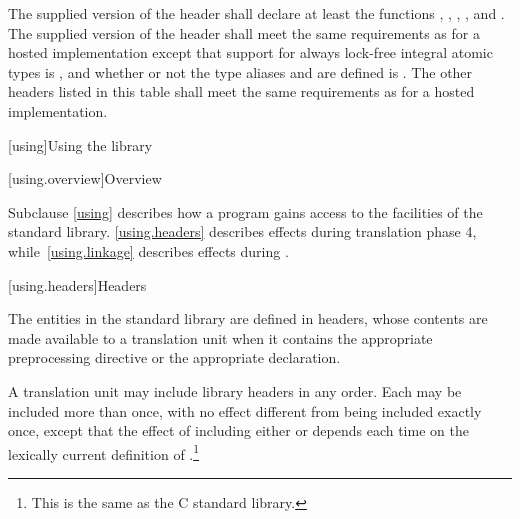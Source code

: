 \pnum
The supplied version of the header 
shall declare at least the functions
%
,
%
,
%
,
%
,
and
%
.
The supplied version of the header 
shall meet the same requirements as for a hosted implementation
except that support for
always lock-free integral atomic types
is , and
whether or not the type aliases  and
 are defined
is .
The other headers listed in this table
shall meet the same requirements as for a hosted implementation.

[using]{Using the library}

[using.overview]{Overview}

\pnum
Subclause \ref{using} describes how a \Cpp{} program gains access to the facilities of the
\Cpp{} standard library. \ref{using.headers} describes effects during translation
phase 4, while~\ref{using.linkage} describes effects during .

[using.headers]{Headers}

\pnum
The entities in the \Cpp{} standard library are defined in headers,
whose contents are made available to a translation unit when it contains the appropriate
%
%
preprocessing directive
or the appropriate
%
 declaration.

\pnum
A translation unit may include library headers in any order.
%
Each may be included more than once, with no effect different from
being included exactly once, except that the effect of including either
 or 
depends each time on the lexically current definition of
%
%
.\footnote{This is the same as the C standard library.}

